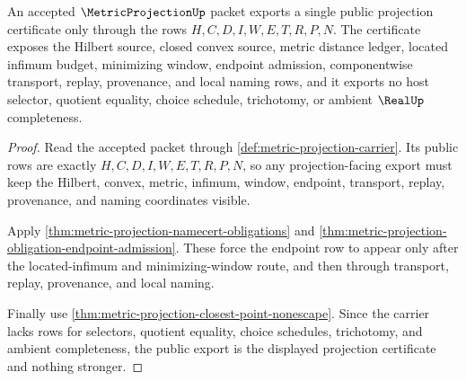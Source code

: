 \begin{theorem}\label{thm:metricprojection-public-projection-certificate}
An accepted $\MetricProjectionUp$ packet exports a single public projection certificate only through the rows $H,C,D,I,W,E,T,R,P,N$. The certificate exposes the Hilbert source, closed convex source, metric distance ledger, located infimum budget, minimizing window, endpoint admission, componentwise transport, replay, provenance, and local naming rows, and it exports no host selector, quotient equality, choice schedule, trichotomy, or ambient $\RealUp$ completeness.
\end{theorem}
\begin{proof}
Read the accepted packet through \autoref{def:metric-projection-carrier}. Its public rows are exactly $H,C,D,I,W,E,T,R,P,N$, so any projection-facing export must keep the Hilbert, convex, metric, infimum, window, endpoint, transport, replay, provenance, and naming coordinates visible.

Apply \autoref{thm:metric-projection-namecert-obligations} and \autoref{thm:metric-projection-obligation-endpoint-admission}. These force the endpoint row to appear only after the located-infimum and minimizing-window route, and then through transport, replay, provenance, and local naming.

Finally use \autoref{thm:metric-projection-closest-point-nonescape}. Since the carrier lacks rows for selectors, quotient equality, choice schedules, trichotomy, and ambient completeness, the public export is the displayed projection certificate and nothing stronger.
\end{proof}


